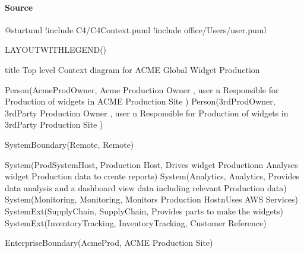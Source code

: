 \documentclass[letterpaper,10pt,english]{sphinxmanual}
\begin{document}
\paragraph{Source}
\label{\detokenize{C4/c4acme:source}}
\begin{figure}[htbp]
\centering
\capstart

\caption{}\label{\detokenize{C4/c4acme:id7}}\end{figure}

\begin{sphinxVerbatim}[commandchars=\\\{\},numbers=left,firstnumber=1,stepnumber=1]
@startuml
!include  \PYGZlt{}C4/C4\PYGZus{}Context.puml\PYGZgt{}
!include \PYGZlt{}office/Users/user.puml\PYGZgt{}

LAYOUT\PYGZus{}WITH\PYGZus{}LEGEND()


title Top level Context diagram for ACME Global Widget Production


Person(AcmeProdOwner, Acme Production Owner , \PYGZdq{}\PYGZlt{}\PYGZdl{}user\PYGZgt{} \PYGZbs{}n Responsible for Production of widgets in ACME Production Site\PYGZdq{} )
Person(3rdProdOwner, 3rdParty Production Owner , \PYGZdq{}\PYGZlt{}\PYGZdl{}user\PYGZgt{} \PYGZbs{}n Responsible for Production of widgets in 3rdParty Production Site\PYGZdq{} )


System\PYGZus{}Boundary(Remote, \PYGZdq{}Remote\PYGZdq{}) \PYGZob{}

    System(ProdSystemHost, \PYGZdq{}Production Host\PYGZdq{}, \PYGZdq{}Drives widget Production\PYGZbs{}n Analyses widget Production data to create reports\PYGZdq{})
    System(Analytics, \PYGZdq{}Analytics\PYGZdq{}, \PYGZdq{}Provides data analysis and a dashboard view data \PYGZhy{} including relevant Production data\PYGZdq{})
    System(Monitoring, \PYGZdq{}Monitoring\PYGZdq{}, \PYGZdq{}Monitors Production Host\PYGZbs{}nUses AWS Services\PYGZdq{})
    System\PYGZus{}Ext(SupplyChain, \PYGZdq{}SupplyChain\PYGZdq{}, \PYGZdq{}Provides parts to make the widgets\PYGZdq{})
    System\PYGZus{}Ext(InventoryTracking, \PYGZdq{}InventoryTracking\PYGZdq{}, \PYGZdq{}Customer Reference\PYGZdq{})
    

\PYGZcb{}



Enterprise\PYGZus{}Boundary(AcmeProd, \PYGZdq{}ACME Production Site\PYGZdq{}) \PYGZob{}


\end{sphinxVerbatim}
\end{document}
